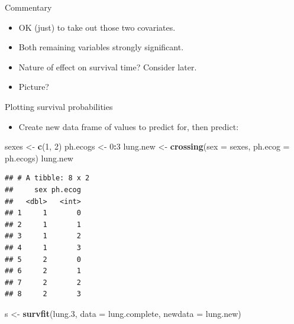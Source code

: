 \documentclass[ignorenonframetext,]{beamer}
\newenvironment{Shaded}{\begin{snugshade}}{\end{snugshade}}
\newcommand{\DataTypeTok}[1]{\textcolor[rgb]{0.13,0.29,0.53}{#1}}
\newcommand{\DecValTok}[1]{\textcolor[rgb]{0.00,0.00,0.81}{#1}}
\newcommand{\FloatTok}[1]{\textcolor[rgb]{0.00,0.00,0.81}{#1}}
\newcommand{\KeywordTok}[1]{\textcolor[rgb]{0.13,0.29,0.53}{\textbf{#1}}}
\newcommand{\NormalTok}[1]{#1}
\newcommand{\OperatorTok}[1]{\textcolor[rgb]{0.81,0.36,0.00}{\textbf{#1}}}
\newcommand{\StringTok}[1]{\textcolor[rgb]{0.31,0.60,0.02}{#1}}
\providecommand{\tightlist}{%
  \setlength{\itemsep}{0pt}\setlength{\parskip}{0pt}}
\begin{document}
\begin{frame}{Commentary}
\protect\hypertarget{commentary}{}

\begin{itemize}
\item
  OK (just) to take out those two covariates.
\item
  Both remaining variables strongly significant.
\item
  Nature of effect on survival time? Consider later.
\item
  Picture?
\end{itemize}

\end{frame}

\begin{frame}[fragile]{Plotting survival probabilities}
\protect\hypertarget{plotting-survival-probabilities-1}{}

\begin{itemize}
\tightlist
\item
  Create new data frame of values to predict for, then predict:
\end{itemize}

\footnotesize

\begin{Shaded}
\begin{Highlighting}[]
\NormalTok{sexes <-}\StringTok{ }\KeywordTok{c}\NormalTok{(}\DecValTok{1}\NormalTok{, }\DecValTok{2}\NormalTok{)}
\NormalTok{ph.ecogs <-}\StringTok{ }\DecValTok{0}\OperatorTok{:}\DecValTok{3}
\NormalTok{lung.new <-}\StringTok{ }\KeywordTok{crossing}\NormalTok{(}\DataTypeTok{sex =}\NormalTok{ sexes, }\DataTypeTok{ph.ecog =}\NormalTok{ ph.ecogs)}
\NormalTok{lung.new}
\end{Highlighting}
\end{Shaded}

\begin{verbatim}
## # A tibble: 8 x 2
##     sex ph.ecog
##   <dbl>   <int>
## 1     1       0
## 2     1       1
## 3     1       2
## 4     1       3
## 5     2       0
## 6     2       1
## 7     2       2
## 8     2       3
\end{verbatim}

\begin{Shaded}
\begin{Highlighting}[]
\NormalTok{s <-}\StringTok{ }\KeywordTok{survfit}\NormalTok{(lung}\FloatTok{.3}\NormalTok{, }\DataTypeTok{data =}\NormalTok{ lung.complete, }\DataTypeTok{newdata =}\NormalTok{ lung.new)}
\end{Highlighting}
\end{Shaded}

\normalsize

\end{frame}
\end{document}
